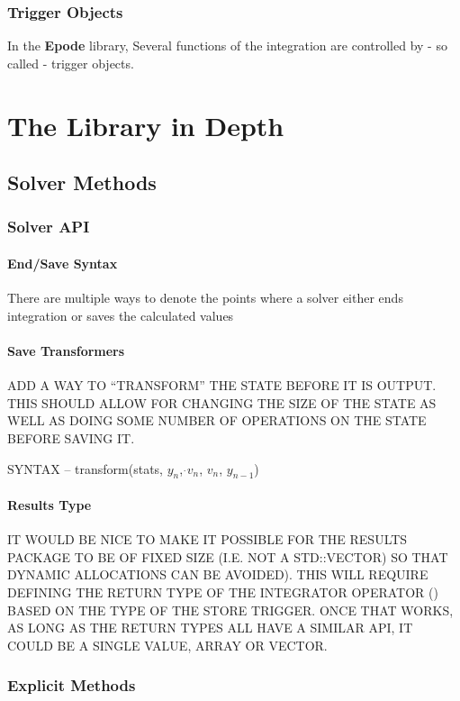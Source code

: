 \documentclass[letterpaper,10pt]{book}
\newcommand{\epode}[0]{\textbf{Epode}}
\begin{document}
    \section{Trigger Objects}
      In the \epode{} library, Several functions of the integration are controlled by - so called - trigger objects.

\part{The Library in Depth}
  \chapter{Solver Methods}
    \section{Solver API}
    
      \subsection{End/Save Syntax}
	There are multiple ways to denote the points where a solver either ends integration or saves the calculated values
	
      \subsection{Save Transformers}
	ADD A WAY TO ``TRANSFORM'' THE STATE BEFORE IT IS OUTPUT.  THIS SHOULD ALLOW FOR CHANGING THE SIZE OF THE STATE AS WELL AS DOING SOME NUMBER OF OPERATIONS ON THE STATE BEFORE SAVING IT.
	
	SYNTAX -- transform(stats, $y_{n}$, $\dot{}v_{n}$, $v_{n}$, $y_{n-1}$)
	
      \subsection{Results Type}
      IT WOULD BE NICE TO MAKE IT POSSIBLE FOR THE RESULTS PACKAGE TO BE OF FIXED SIZE (I.E. NOT A STD::VECTOR) SO THAT DYNAMIC ALLOCATIONS CAN BE AVOIDED).  THIS WILL REQUIRE DEFINING THE RETURN TYPE OF THE INTEGRATOR OPERATOR () BASED ON THE TYPE OF THE STORE TRIGGER.  ONCE THAT WORKS, AS LONG AS THE RETURN TYPES ALL HAVE A SIMILAR API, IT COULD BE A SINGLE VALUE, ARRAY OR VECTOR.
      
      
    \section{Explicit Methods}
    
\end{document}
